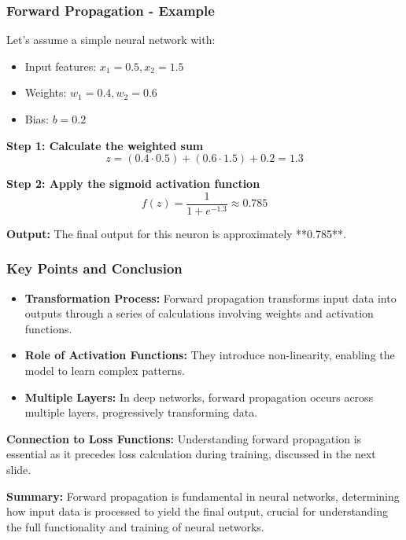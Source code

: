 \documentclass[aspectratio=169]{beamer}
\begin{document}
\begin{frame}[fragile]
    \frametitle{Forward Propagation - Example}
    Let’s assume a simple neural network with:
    \begin{itemize}
        \item Input features: \( x_1 = 0.5, x_2 = 1.5 \)
        \item Weights: \( w_1 = 0.4, w_2 = 0.6 \)
        \item Bias: \( b = 0.2 \)
    \end{itemize}

    \textbf{Step 1: Calculate the weighted sum}
    \begin{equation}
        z = (0.4 \cdot 0.5) + (0.6 \cdot 1.5) + 0.2 = 1.3
    \end{equation}

    \textbf{Step 2: Apply the sigmoid activation function}
    \begin{equation}
        f(z) = \frac{1}{1 + e^{-1.3}} \approx 0.785
    \end{equation}

    \textbf{Output:} The final output for this neuron is approximately **0.785**.
\end{frame}

\begin{frame}[fragile]
    \frametitle{Key Points and Conclusion}
    \begin{itemize}
        \item \textbf{Transformation Process:} Forward propagation transforms input data into outputs through a series of calculations involving weights and activation functions.
        \item \textbf{Role of Activation Functions:} They introduce non-linearity, enabling the model to learn complex patterns.
        \item \textbf{Multiple Layers:} In deep networks, forward propagation occurs across multiple layers, progressively transforming data.
    \end{itemize}

    \textbf{Connection to Loss Functions:} Understanding forward propagation is essential as it precedes loss calculation during training, discussed in the next slide.

    \textbf{Summary:} Forward propagation is fundamental in neural networks, determining how input data is processed to yield the final output, crucial for understanding the full functionality and training of neural networks.
\end{frame}
\end{document}
